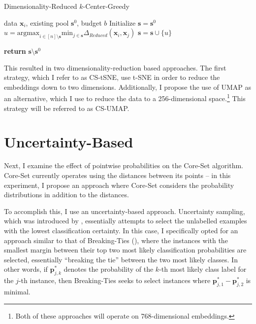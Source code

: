 \documentclass[english,bachelor,ul]{webisthesis} %
\begin{document}
\begin{algorithm}[htpb]
\caption{Dimensionality-Reduced $k$-Center-Greedy}%
\label{alg:coreset-dr}
\begin{algorithmic}


\Require data $ \mathbf{x}_i $, existing pool $ \mathbf{s}^0 $, budget $ b $
\State Initialize $ \mathbf{s} = \mathbf{s}^0 $
\Repeat
\State $ u = \text{argmax}_{i \in [n] \setminus \mathbf{s}} \text{min}_{j \in \mathbf{s}} \Delta_{Reduced}(\mathbf{x}_i, \mathbf{x}_j) $
\State $ \mathbf{s} = \mathbf{s} \cup \{u\} $

\State \textbf{return} $\mathbf{s} \setminus \mathbf{s}^0 $
\end{algorithmic}
\end{algorithm}

This resulted in two dimensionality-reduction based approaches. The first strategy, which I refer to as CS-tSNE, use t-SNE in order to reduce the embeddings down to two dimensions. Additionally, I propose the use of UMAP as an alternative, which I use to reduce the data to a 256-dimensional space.\footnote{Both of these approaches will operate on 768-dimensional embeddings.} This strategy will be referred to as CS-UMAP. 

\section{Uncertainty-Based}

Next, I examine the effect of pointwise probabilities on the Core-Set algorithm. Core-Set currently operates using the distances between its points -- in this experiment, I propose an approach where Core-Set considers the probability distributions in addition to the distances. 

To accomplish this, I use an uncertainty-based approach. Uncertainty sampling, which was introduced by \cite{DBLP:conf/sigir/LewisG94}, essentially attempts to select the unlabelled examples with the lowest classification certainty. In this case, I specifically opted for an approach similar to that of Breaking-Ties (\cite{DBLP:journals/jmlr/LuoKGHSRH05}), where the instances with the smallest margin between their top two most likely classification probabilities are selected, essentially ``breaking the tie'' between the two most likely classes. In other words, if $ \mathbf{p}_{j, k}^* $ denotes the probability of the $ k $-th most likely class label for the $ j $-th instance, then Breaking-Ties seeks to select instances where $ \mathbf{p}_{j, 1}^* - \mathbf{p}_{j, 2}^* $ is minimal.
\end{document}
